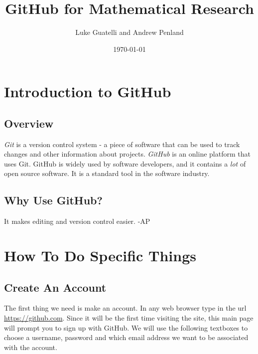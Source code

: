 \documentclass[11pt]{article}
\title{GitHub for Mathematical Research}
\author{Luke Guatelli and Andrew Penland}
\date{\today}
\begin{document}
\maketitle

\section{Introduction to GitHub}

\subsection{Overview}

\textit{Git} is a version control system - a piece of software that can be used to track changes and other information about projects. \textit{GitHub} is an online platform that uses Git. GitHub is widely used by software developers, and it contains a \textit{lot} of open source software. It is a standard tool in the software industry. 

\subsection{Why Use GitHub?}

It makes editing and version control easier. -AP

\section{How To Do Specific Things}
\newpage
\subsection{Create An Account}

The first thing we need is make an account. In any web browser type in the url \url{https://github.com}. Since it will be the first time visiting the site, this main page will prompt you to sign up with GitHub. We will use the following textboxes to choose a username, password and which email address we want to be associated with the account.
\end{document}
